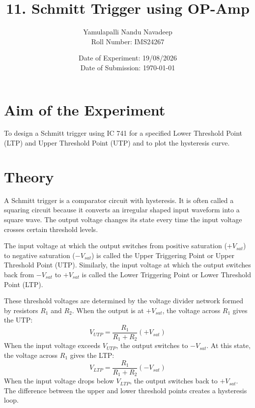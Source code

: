 \documentclass[12pt,a4paper]{article}
\title{\textbf{11. Schmitt Trigger using OP-Amp}}
\author{Yamulapalli Nandu Navadeep \\ Roll Number: IMS24267}
\date{Date of Experiment: 19/08/2026 \\ Date of Submission: \today}
\begin{document}
\maketitle

\section{Aim of the Experiment}
To design a Schmitt trigger using IC 741 for a specified Lower Threshold Point (LTP) and Upper Threshold Point (UTP) and to plot the hysteresis curve.

\section{Theory}
A Schmitt trigger is a comparator circuit with hysteresis. It is often called a squaring circuit because it converts an irregular shaped input waveform into a square wave. The output voltage changes its state every time the input voltage crosses certain threshold levels.

The input voltage at which the output switches from positive saturation ($+V_{sat}$) to negative saturation ($-V_{sat}$) is called the Upper Triggering Point or Upper Threshold Point (UTP). Similarly, the input voltage at which the output switches back from $-V_{sat}$ to $+V_{sat}$ is called the Lower Triggering Point or Lower Threshold Point (LTP).

These threshold voltages are determined by the voltage divider network formed by resistors $R_1$ and $R_2$. When the output is at $+V_{sat}$, the voltage across $R_1$ gives the UTP:
$$ V_{UTP} = \frac{R_1}{R_1 + R_2} (+V_{sat}) $$
When the input voltage exceeds $V_{UTP}$, the output switches to $-V_{sat}$. At this state, the voltage across $R_1$ gives the LTP:
$$ V_{LTP} = \frac{R_1}{R_1 + R_2} (-V_{sat}) $$
When the input voltage drops below $V_{LTP}$, the output switches back to $+V_{sat}$. The difference between the upper and lower threshold points creates a hysteresis loop.
\end{document}
